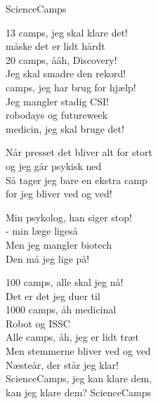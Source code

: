 \begin{song}{ScienceCamps}
  \begin{SBChorus}
    13 camps, jeg skal klare det!\\
    måske det er lidt hårdt\\
    20 camps, ååh, Discovery!\\
    Jeg skal smadre den rekord!\\ camps, jeg har brug for hjælp!\\
    Jeg mangler stadig CSI!\\
    robodays og futureweek\\
    medicin, jeg skal bruge det!
  \end{SBChorus}

  \begin{SBVerse}
    Når presset det bliver alt for stort\\
    og jeg går psykisk ned\\
    Så tager jeg bare en ekstra camp\\
    for jeg bliver ved og ved!
  \end{SBVerse}

  \begin{SBVerse}
    Min psykolog, han siger stop!\\
    - min læge ligeså\\
    Men jeg mangler biotech\\
    Den må jeg lige på!
  \end{SBVerse}

  \begin{SBChorus}
    100 camps, alle skal jeg nå!\\
    Det er det jeg duer til\\
    1000 camps, åh medicinal\\
    Robot og ISSC\\\medskip
    Alle camps, åh, jeg er lidt træt\\
    Men stemmerne bliver ved og ved\\
    Næsteår, der står jeg klar!\\
    ScienceCamps, jeg kan klare dem,\\
    kan jeg klare dem? ScienceCamps
  \end{SBChorus}
\end{song}
